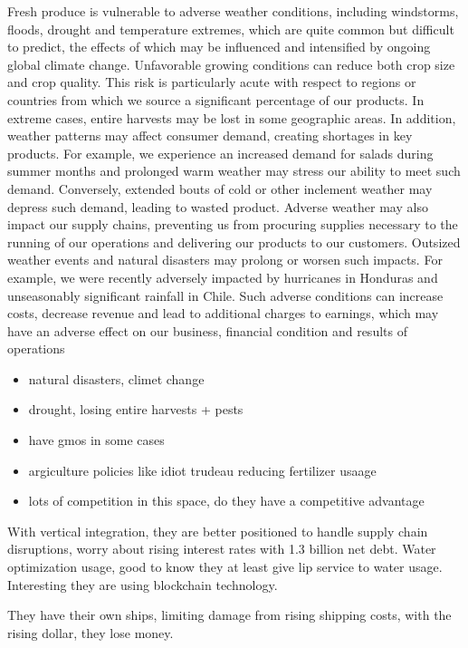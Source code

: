 Fresh produce is vulnerable to adverse weather conditions, including windstorms, floods, drought and temperature extremes, which are quite common but difficult to predict, the effects of
which may be influenced and intensified by ongoing global climate change. Unfavorable growing conditions can reduce both crop size and crop quality. This risk is particularly acute with respect to
regions or countries from which we source a significant percentage of our products. In extreme cases, entire harvests may be lost in some geographic areas. In addition, weather patterns may affect
consumer demand, creating shortages in key products. For example, we experience an increased demand for salads during summer months and prolonged warm weather may stress our ability to meet
such demand. Conversely, extended bouts of cold or other inclement weather may depress such demand, leading to wasted product. Adverse weather may also impact our supply chains, preventing us
from procuring supplies necessary to the running of our operations and delivering our products to our customers. Outsized weather events and natural disasters may prolong or worsen such impacts.
For example, we were recently adversely impacted by hurricanes in Honduras and unseasonably significant rainfall in Chile. Such adverse conditions can increase costs, decrease revenue and lead to
additional charges to earnings, which may have an adverse effect on our business, financial condition and results of operations

\begin{itemize}
    \item natural disasters, climet change
    \item drought, losing entire harvests + pests
    \item have gmos in some cases
    \item argiculture policies like idiot trudeau reducing fertilizer usaage
    \item lots of competition in this space, do they have a competitive advantage
\end{itemize}

With vertical integration, they are better positioned to handle supply chain disruptions, worry about rising interest rates with 1.3 billion net debt. Water optimization usage, good to know they at least give lip service to water usage. Interesting they are using blockchain technology.

They have their own ships, limiting damage from rising shipping costs, with the rising dollar, they lose money.